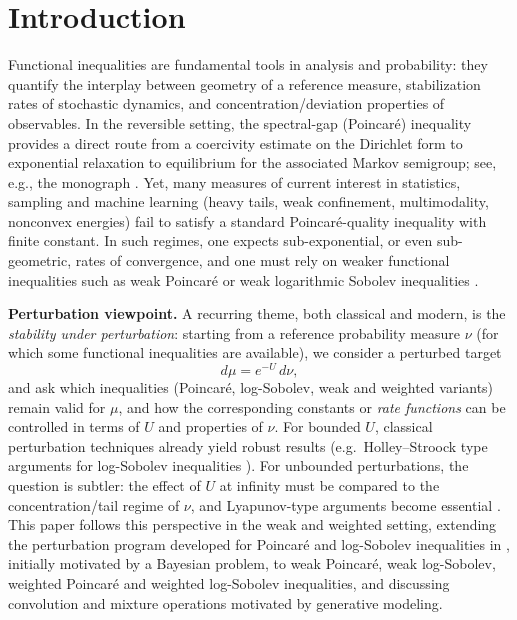 \documentclass[11pt,reqno]{amsart}
\numberwithin{equation}{section}
\theoremstyle{definition}
\theoremstyle{remark}
\begin{document}
\section{Introduction}

Functional inequalities are fundamental tools in analysis and probability: they quantify the interplay between geometry of a reference measure, stabilization rates of stochastic dynamics, and concentration/deviation properties of observables. In the reversible setting, the spectral-gap (Poincar\'e) inequality provides a direct route from a coercivity estimate on the Dirichlet form to exponential relaxation to equilibrium for the associated Markov semigroup; see, e.g., the monograph \cite{BakryGentilLedoux2014}. Yet, many measures of current interest in statistics, sampling and machine learning (heavy tails, weak confinement, multimodality, nonconvex energies) fail to satisfy a standard Poincar\'e-quality inequality with finite constant. In such regimes, one expects sub-exponential, or even sub-geometric, rates of convergence, and one must rely on weaker functional inequalities such as weak Poincar\'e or weak logarithmic Sobolev inequalities \cite{Lig,RW,CGG}.



\noindent\textbf{Perturbation viewpoint.}
A recurring theme, both classical and modern, is the \emph{stability under perturbation}:
starting from a reference probability measure $\nu$ (for which some functional inequalities are available),
we consider a perturbed target
\begin{equation}\label{eq:perturb-mu}
d\mu = {e^{-U}}\,d\nu, 
\end{equation}
and ask which inequalities (Poincar\'e, log-Sobolev, weak and weighted variants) remain valid for $\mu$,
and how the corresponding constants or \emph{rate functions} can be controlled in terms of $U$ and properties of $\nu$.
For bounded $U$, classical perturbation techniques already yield robust results (e.g.\ Holley--Stroock type arguments for log-Sobolev inequalities \cite{HolleyStroock1987}). For unbounded perturbations, the question is subtler: the effect of $U$ at infinity must be compared to the concentration/tail regime of $\nu$, and Lyapunov-type arguments become essential \cite{BCG,BBCG}.
This paper follows this perspective in the weak and weighted setting, extending the perturbation program
developed for Poincar\'e and log-Sobolev inequalities in \cite{CGPerturb}, initially motivated by a Bayesian problem,
to weak Poincar\'e, weak log-Sobolev, weighted Poincar\'e and weighted log-Sobolev inequalities,
and discussing convolution and mixture operations motivated by generative modeling.
\end{document}
